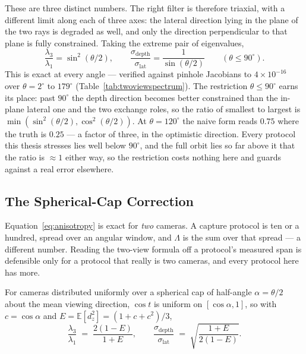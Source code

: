 These are three distinct numbers. The right filter is therefore triaxial, with a different limit along each of
three axes: the lateral
direction lying in the plane of the two rays is degraded as well, and only the
direction perpendicular to that plane is fully constrained. Taking the extreme
pair of eigenvalues,
\begin{equation}
  \frac{\lambda_3}{\lambda_1} = \sin^2(\theta/2),
  \qquad
  \frac{\sigma_{\mathrm{depth}}}{\sigma_{\mathrm{lat}}} = \frac{1}{\sin(\theta/2)}
  \qquad (\theta \le 90^\circ).
  \label{eq:anisotropy}
\end{equation}
This is exact at every angle --- verified against pinhole Jacobians to
$4\times10^{-16}$ over $\theta = 2^\circ$ to $179^\circ$
(Table~\ref{tab:twoviewspectrum}). The restriction $\theta \le 90^\circ$ earns its place: past $90^\circ$ the depth direction becomes better constrained than the
in-plane lateral one and the two exchange roles, so the ratio of smallest to
largest is $\min(\sin^2(\theta/2), \cos^2(\theta/2))$. At $\theta = 120^\circ$
the naive form reads $0.75$ where the truth is $0.25$ --- a factor of three, in
the optimistic direction. Every protocol this thesis stresses lies well below
$90^\circ$, and the full orbit lies so far above it that the ratio is $\approx 1$
either way, so the restriction costs nothing here and guards against a real error elsewhere.

\subsection{The Spherical-Cap Correction}
\label{sec:capprediction}

Equation~\eqref{eq:anisotropy} is exact for \emph{two} cameras. A capture
protocol is ten or a hundred, spread over an angular window, and $\Lambda$ is the
sum over that spread --- a different number. Reading the two-view formula off a protocol's measured span is defensible only
for a protocol that really is two cameras, and every protocol here has more.

For cameras distributed uniformly over a spherical cap of half-angle
$\alpha = \theta/2$ about the mean viewing direction, $\cos t$ is uniform on
$[\cos\alpha, 1]$, so with $c = \cos\alpha$ and $E = \mathbb{E}[d_z^2] =
(1+c+c^2)/3$,
\begin{equation}
  \frac{\lambda_3}{\lambda_1} \;=\; \frac{2(1-E)}{1+E},
  \qquad
  \frac{\sigma_{\mathrm{depth}}}{\sigma_{\mathrm{lat}}}
  \;=\; \sqrt{\frac{1+E}{2(1-E)}} .
  \label{eq:cap}
\end{equation}

